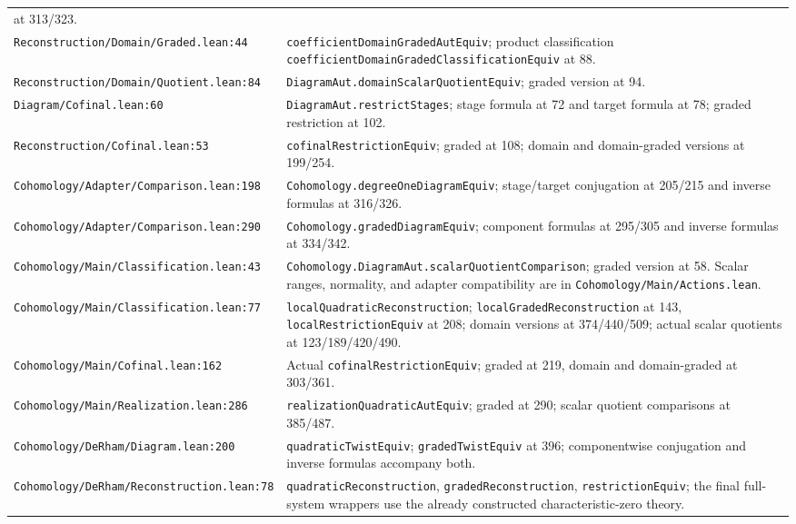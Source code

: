 \documentclass[11pt]{article}
\theoremstyle{remark}\newtheorem{remark}[theorem]{Remark}
\newcommand{\code}[1]{{\normalfont\nolinkurl{#1}}}
\begin{document}
\begin{longtable}{@{}p{}p{}@{}}
at 313/323.\\
\code{Reconstruction/Domain/Graded.lean:44}&
\code{coefficientDomainGradedAutEquiv}; product classification
\code{coefficientDomainGradedClassificationEquiv} at 88.\\
\code{Reconstruction/Domain/Quotient.lean:84}&
\code{DiagramAut.domainScalarQuotientEquiv}; graded version at 94.\\
\code{Diagram/Cofinal.lean:60}&
\code{DiagramAut.restrictStages}; stage formula at 72 and target
formula at 78; graded restriction at 102.\\
\code{Reconstruction/Cofinal.lean:53}&
\code{cofinalRestrictionEquiv}; graded at 108;
domain and domain-graded versions at 199/254.\\
\code{Cohomology/Adapter/Comparison.lean:198}&
\code{Cohomology.degreeOneDiagramEquiv}; stage/target conjugation
at 205/215 and inverse formulas at 316/326.\\
\code{Cohomology/Adapter/Comparison.lean:290}&
\code{Cohomology.gradedDiagramEquiv}; component formulas at
295/305 and inverse formulas at 334/342.\\
\code{Cohomology/Main/Classification.lean:43}&
\code{Cohomology.DiagramAut.scalarQuotientComparison}; graded
version at 58. Scalar ranges, normality, and adapter compatibility
are in \code{Cohomology/Main/Actions.lean}.\\
\code{Cohomology/Main/Classification.lean:77}&
\code{localQuadraticReconstruction}; \code{localGradedReconstruction}
at 143, \code{localRestrictionEquiv} at 208; domain versions at
374/440/509; actual scalar quotients at 123/189/420/490.\\
\code{Cohomology/Main/Cofinal.lean:162}&
Actual \code{cofinalRestrictionEquiv}; graded at 219,
domain and domain-graded at 303/361.\\
\code{Cohomology/Main/Realization.lean:286}&
\code{realizationQuadraticAutEquiv}; graded at 290;
scalar quotient comparisons at 385/487.\\
\code{Cohomology/DeRham/Diagram.lean:200}&
\code{quadraticTwistEquiv}; \code{gradedTwistEquiv} at 396;
componentwise conjugation and inverse formulas accompany both.\\
\code{Cohomology/DeRham/Reconstruction.lean:78}&
\code{quadraticReconstruction}, \code{gradedReconstruction},
\code{restrictionEquiv}; the final full-system wrappers use
the already constructed characteristic-zero theory.\\
\bottomrule
\end{longtable}
\normalsize
\end{document}
